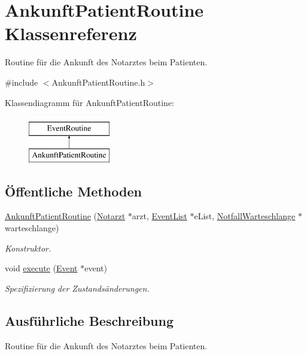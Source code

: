 \hypertarget{classAnkunftPatientRoutine}{}\section{Ankunft\+Patient\+Routine Klassenreferenz}
\label{classAnkunftPatientRoutine}


Routine für die Ankunft des Notarztes beim Patienten.  




{\ttfamily \#include $<$Ankunft\+Patient\+Routine.\+h$>$}

Klassendiagramm für Ankunft\+Patient\+Routine\+:\begin{figure}[H]
\begin{center}
\leavevmode
\includegraphics[height=2.000000cm]{classAnkunftPatientRoutine}
\end{center}
\end{figure}
\subsection*{Öffentliche Methoden}
\begin{DoxyCompactItemize}
\item 
\hyperlink{classAnkunftPatientRoutine_af9bd136552d3e2acd505620ca5164f58}{Ankunft\+Patient\+Routine} (\hyperlink{classNotarzt}{Notarzt} $\ast$arzt, \hyperlink{classEventList}{Event\+List} $\ast$e\+List, \hyperlink{classNotfallWarteschlange}{Notfall\+Warteschlange} $\ast$warteschlange)
\begin{DoxyCompactList}\small\item\em Konstruktor. \end{DoxyCompactList}\item 
void \hyperlink{classAnkunftPatientRoutine_a42cdf97821606ce3d4f807b685f3a70d}{execute} (\hyperlink{classEvent}{Event} $\ast$event)
\begin{DoxyCompactList}\small\item\em Spezifizierung der Zustandsänderungen. \end{DoxyCompactList}\end{DoxyCompactItemize}


\subsection{Ausführliche Beschreibung}
Routine für die Ankunft des Notarztes beim Patienten. 

